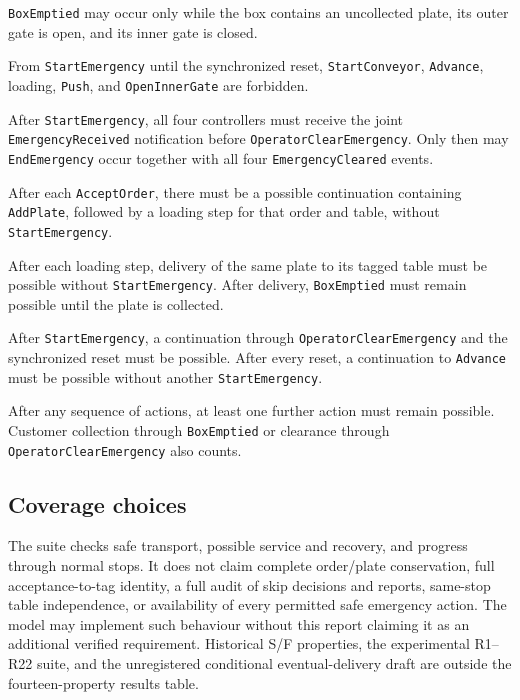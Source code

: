 \documentclass[11pt,a4paper]{article}
\begin{document}
\begin{description}[leftmargin=3em,labelwidth=2.5em,labelsep=0.5em,itemsep=0.4em]
  \item[\ref{req:r8}] \texttt{BoxEmptied} may occur only while the box contains an uncollected plate, its outer gate is open, and its inner gate is closed.

  \item[\ref{req:r9}] From \texttt{StartEmergency} until the synchronized reset, \texttt{StartConveyor}, \texttt{Advance}, loading, \texttt{Push}, and \texttt{OpenInnerGate} are forbidden.

  \item[\ref{req:r10}] After \texttt{StartEmergency}, all four controllers must receive the joint \texttt{EmergencyReceived} notification before \texttt{OperatorClearEmergency}. Only then may \texttt{EndEmergency} occur together with all four \texttt{EmergencyCleared} events.

  \item[\ref{req:r11}] After each \texttt{AcceptOrder}, there must be a possible continuation containing \texttt{AddPlate}, followed by a loading step for that order and table, without \texttt{StartEmergency}.

  \item[\ref{req:r12}] After each loading step, delivery of the same plate to its tagged table must be possible without \texttt{StartEmergency}. After delivery, \texttt{BoxEmptied} must remain possible until the plate is collected.

  \item[\ref{req:r13}] After \texttt{StartEmergency}, a continuation through \texttt{OperatorClearEmergency} and the synchronized reset must be possible. After every reset, a continuation to \texttt{Advance} must be possible without another \texttt{StartEmergency}.

  \item[\ref{req:r14}] After any sequence of actions, at least one further action must remain possible. Customer collection through \texttt{BoxEmptied} or clearance through \texttt{OperatorClearEmergency} also counts.
\end{description}


\subsection{Coverage choices}
The suite checks safe transport, possible service and recovery, and progress through normal stops. It does not claim complete order/plate conservation, full acceptance-to-tag identity, a full audit of skip decisions and reports, same-stop table independence, or availability of every permitted safe emergency action. The model may implement such behaviour without this report claiming it as an additional verified requirement. Historical S/F properties, the experimental R1--R22 suite, and the unregistered conditional eventual-delivery draft are outside the fourteen-property results table.
\end{document}
